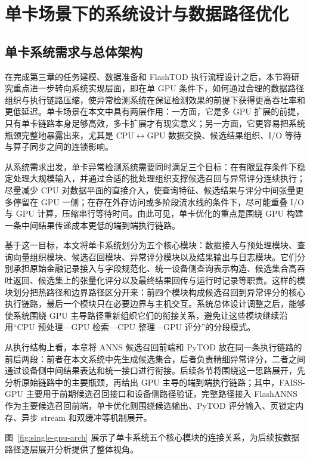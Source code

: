 
\chapter{单卡场景下的系统设计与数据路径优化}

\section{单卡系统需求与总体架构}

在完成第三章的任务建模、数据准备和 FlashTOD 执行流程设计之后，本节将研究重点进一步转向系统实现层面，即在单 GPU 条件下，如何通过合理的数据路径组织与执行链路压缩，使异常检测系统在保证检测效果的前提下获得更高吞吐率和更低延迟。单卡场景在本文中具有两层作用：一方面，它是多 GPU 扩展的前提，只有单卡链路本身足够高效，多卡扩展才有现实意义；另一方面，它更容易把系统瓶颈完整地暴露出来，尤其是 CPU$\leftrightarrow$GPU 数据交换、候选结果组织、I/O 等待与算子同步之间的连锁影响。

从系统需求出发，单卡异常检测系统需要同时满足三个目标：在有限显存条件下稳定处理大规模输入，并通过合适的批处理组织支撑候选召回与异常评分连续执行；尽量减少 CPU 对数据平面的直接介入，使查询特征、候选结果与评分中间张量更多停留在 GPU 一侧；在存在外存访问或多阶段流水线的条件下，尽可能重叠 I/O 与 GPU 计算，压缩串行等待时间。由此可见，单卡优化的重点是围绕 GPU 构建一条中间结果传递成本更低的端到端执行链路。

基于这一目标，本文将单卡系统划分为五个核心模块：数据接入与预处理模块、查询向量组织模块、候选召回模块、异常评分模块以及结果输出与日志模块。它们分别承担原始金融记录接入与字段规范化、统一设备侧查询表示构造、候选集合高吞吐返回、候选集上的张量化评分以及最终结果回传与运行时记录等职责。这样的模块划分把热路径和边界路径区分开来：前四个模块构成候选召回到异常评分的核心执行链路，最后一个模块只在必要边界与主机交互。系统总体设计调整之后，能够使系统围绕 GPU 主导路径重新组织它们的衔接关系，避免让这些模块继续沿用``CPU 预处理---GPU 检索---CPU 整理---GPU 评分''的分段模式。

从执行结构上看，本章将 ANNS 候选召回前端和 PyTOD 放在同一条执行链路的前后两段：前者在本文系统中先生成候选集合，后者负责精细异常评分，二者之间通过设备侧中间结果表达和统一接口进行衔接。后续各节将围绕这一思路展开，先分析原始链路中的主要瓶颈，再给出 GPU 主导的端到端执行链路；其中，FAISS-GPU 主要用于前期候选召回接口和设备侧路径验证，完整路径接入 FlashANNS 作为主要候选召回前端，单卡优化则围绕候选输出、PyTOD 评分输入、页锁定内存、异步 stream 和双缓冲等机制展开。

图~\ref{fig:single-gpu-arch} 展示了单卡系统五个核心模块的连接关系，为后续按数据路径逐层展开分析提供了整体视角。

